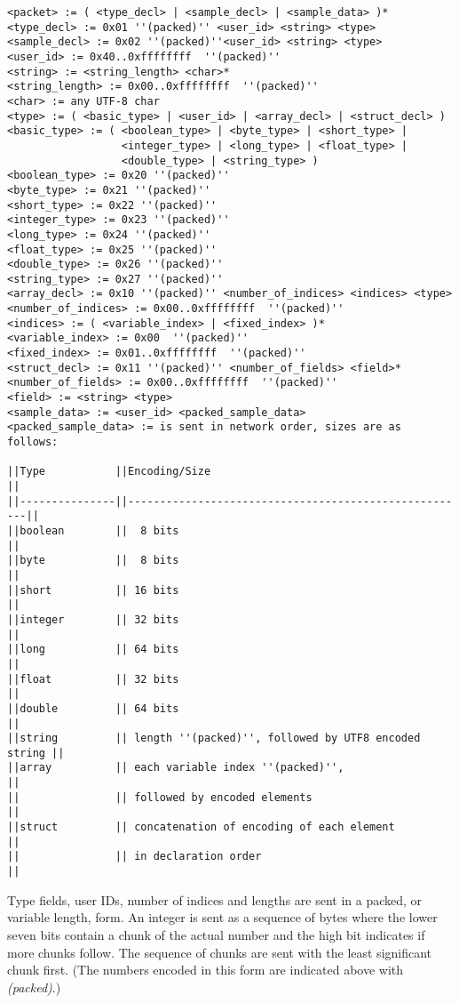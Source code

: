 \documentclass[a4paper]{article}
\begin{document}
\begin{verbatim}
<packet> := ( <type_decl> | <sample_decl> | <sample_data> )*
<type_decl> := 0x01 ''(packed)'' <user_id> <string> <type>
<sample_decl> := 0x02 ''(packed)''<user_id> <string> <type>
<user_id> := 0x40..0xffffffff  ''(packed)''
<string> := <string_length> <char>*
<string_length> := 0x00..0xffffffff  ''(packed)''
<char> := any UTF-8 char
<type> := ( <basic_type> | <user_id> | <array_decl> | <struct_decl> )
<basic_type> := ( <boolean_type> | <byte_type> | <short_type> |
                  <integer_type> | <long_type> | <float_type> | 
                  <double_type> | <string_type> )
<boolean_type> := 0x20 ''(packed)''
<byte_type> := 0x21 ''(packed)''
<short_type> := 0x22 ''(packed)''
<integer_type> := 0x23 ''(packed)''
<long_type> := 0x24 ''(packed)''
<float_type> := 0x25 ''(packed)''
<double_type> := 0x26 ''(packed)''
<string_type> := 0x27 ''(packed)''
<array_decl> := 0x10 ''(packed)'' <number_of_indices> <indices> <type>
<number_of_indices> := 0x00..0xffffffff  ''(packed)''
<indices> := ( <variable_index> | <fixed_index> )*
<variable_index> := 0x00  ''(packed)''
<fixed_index> := 0x01..0xffffffff  ''(packed)''
<struct_decl> := 0x11 ''(packed)'' <number_of_fields> <field>*
<number_of_fields> := 0x00..0xffffffff  ''(packed)''
<field> := <string> <type>
<sample_data> := <user_id> <packed_sample_data>
<packed_sample_data> := is sent in network order, sizes are as follows:

||Type           ||Encoding/Size                                         ||
||---------------||------------------------------------------------------||
||boolean        ||  8 bits                                              ||
||byte           ||  8 bits                                              ||
||short          || 16 bits                                              ||
||integer        || 32 bits                                              ||
||long           || 64 bits                                              ||
||float          || 32 bits                                              ||
||double         || 64 bits                                              ||
||string         || length ''(packed)'', followed by UTF8 encoded string ||
||array          || each variable index ''(packed)'',                    ||
||               || followed by encoded elements                         ||
||struct         || concatenation of encoding of each element            ||
||               || in declaration order                                 ||
\end{verbatim}

Type fields, user IDs, number of indices and lengths are sent in a packed, or
variable length, form.  An integer is sent as a sequence of bytes where the
lower seven bits contain a chunk of the actual number and the high bit
indicates if more chunks follow. The sequence of chunks are sent with the least
significant chunk first.  (The numbers encoded in this form are indicated above
with \textit{(packed)}.)
\end{document}
